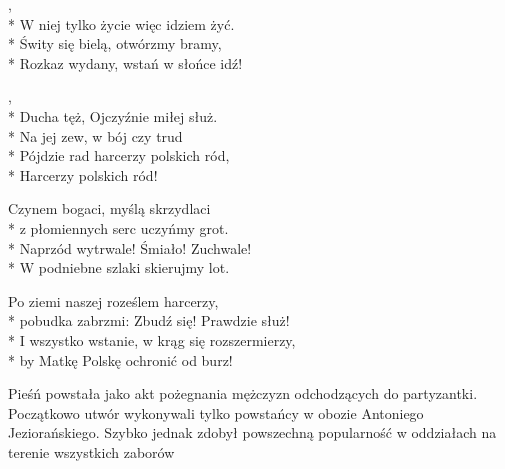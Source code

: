 
\begin{lyrics}[longestline={I wszystko wstanie, w krąg się rozszermierzy,}]

,\\*
W niej tylko życie więc idziem żyć.\\*
Świty się bielą, otwórzmy bramy,\\*
Rozkaz wydany, wstań w słońce idź!

\begin{chorus}
,\\*
Ducha tęż, Ojczyźnie miłej służ.\\*
Na jej zew, w bój czy trud\\*
Pójdzie rad harcerzy polskich ród,\\*
Harcerzy polskich ród!
\end{chorus}

Czynem bogaci, myślą skrzydlaci\\*
z płomiennych serc uczyńmy grot.\\*
Naprzód wytrwale! Śmiało! Zuchwale!\\*
W podniebne szlaki skierujmy lot.

\chorusref

Po ziemi naszej roześlem harcerzy,\\*
pobudka zabrzmi: Zbudź się! Prawdzie służ!\\*
I wszystko wstanie, w krąg się rozszermierzy,\\*
by Matkę Polskę ochronić od burz!

\chorusref
\end{lyrics}



\begin{info}Pieśń powstała jako akt pożegnania mężczyzn odchodzących do partyzantki. Początkowo utwór wykonywali tylko powstańcy w obozie Antoniego Jeziorańskiego. Szybko jednak zdobył powszechną popularność w oddziałach na terenie wszystkich zaborów\end{info}


